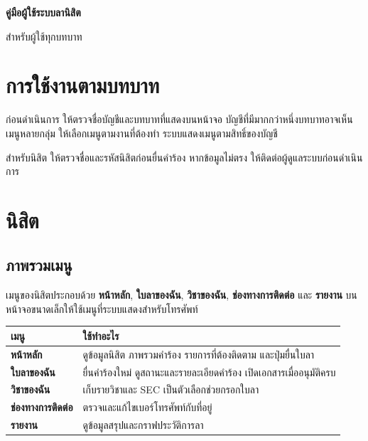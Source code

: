 \documentclass[17pt,a4paper]{extreport}
\begin{document}
\begin{titlepage}
  \centering\vspace*{3cm}
  {\Huge\bfseries คู่มือผู้ใช้ระบบลานิสิต\par}
  \vspace{0.8cm}{\Large คณะวิศวกรรมศาสตร์ มหาวิทยาลัยเกษตรศาสตร์\par}
  \vspace{0.4cm}{\large KUKPS Engineering Leave Request\par}
  \vfill{\large สำหรับผู้ใช้ทุกบทบาท\par}\vspace{2cm}
\end{titlepage}
\tableofcontents\clearpage
\chapter{การใช้งานตามบทบาท}
ก่อนดำเนินการ ให้ตรวจชื่อบัญชีและบทบาทที่แสดงบนหน้าจอ บัญชีที่มีมากกว่าหนึ่งบทบาทอาจเห็นเมนูหลายกลุ่ม ให้เลือกเมนูตามงานที่ต้องทำ ระบบแสดงเมนูตามสิทธิ์ของบัญชี

สำหรับนิสิต ให้ตรวจชื่อและรหัสนิสิตก่อนยื่นคำร้อง หากข้อมูลไม่ตรง ให้ติดต่อผู้ดูแลระบบก่อนดำเนินการ


\chapter{นิสิต}
\section{ภาพรวมเมนู}
เมนูของนิสิตประกอบด้วย \textbf{หน้าหลัก}, \textbf{ใบลาของฉัน}, \textbf{วิชาของฉัน}, \textbf{ช่องทางการติดต่อ} และ \textbf{รายงาน} บนหน้าจอขนาดเล็กให้ใช้เมนูที่ระบบแสดงสำหรับโทรศัพท์

\begin{longtable}{>{\bfseries}p{}p{}}
  เมนู & ใช้ทำอะไร\\\hline
  หน้าหลัก & ดูข้อมูลนิสิต ภาพรวมคำร้อง รายการที่ต้องติดตาม และปุ่มยื่นใบลา\\
  ใบลาของฉัน & ยื่นคำร้องใหม่ ดูสถานะและรายละเอียดคำร้อง เปิดเอกสารเมื่ออนุมัติครบ\\
  วิชาของฉัน & เก็บรายวิชาและ SEC เป็นตัวเลือกช่วยกรอกใบลา\\
  ช่องทางการติดต่อ & ตรวจและแก้ไขเบอร์โทรศัพท์กับที่อยู่\\
  รายงาน & ดูข้อมูลสรุปและกราฟประวัติการลา\\
\end{longtable}
\end{document}
